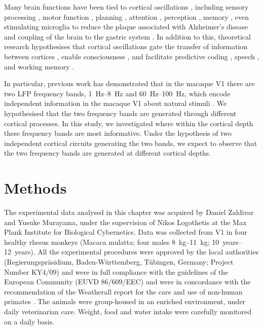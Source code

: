 Many brain functions have been tied to cortical oscillations \citep{Buzsaki2004science,Einevoll2013,Colgin2016}, including sensory processing \citep{Henrie2005,Kreiman2006,Mazzoni2011,Szymanski2011}, motor function \citep{Scherberger2005,Rickert2005}, planning \citep{Buzsaki2015}, attention \citep{Fries2001,Jensen2007,Klimesch2012}, perception \citep{Grossberg1991,Fries1997,Gross2007}, memory \citep{Klimesch1999,Raghavachari2001,Pesaran2002,Jensen2002,Jensen2007,Liebe2012}, even stimulating microglia to reduce the plaque associated with Alzheimer's disease \citep{Iaccarino2016} and coupling of the brain to the gastric system \citep{Monto2008,Richter2017}.
In addition to this, theoretical research hypothesises that cortical oscillations gate the transfer of information between cortices \citep{Ahissar2015}, enable consciousness \citep{Llinas1998}, and facilitate predictive coding \citep{Arnal2012}, speech \citep{Giraud2012}, and working memory \citep{Dipoppa2013}.

In particular, previous work has demonstrated that in the macaque \ac{V1} there are two \ac{LFP} frequency bands, \SIrange{1}{8}{Hz} and \SIrange{60}{100}{Hz}, which encode independent information in the macaque \ac{V1} about natural stimuli \citep{Belitski2008}.
We hypothesised that the two frequency bands are generated through different cortical processes.
In this study, we investigated where within the cortical depth these frequency bands are most informative.
Under the hypothesis of two independent cortical circuits generating the two bands, we expect to observe that the two frequency bands are generated at different cortical depths.


\section{Methods}
\label{sec:lam_exp}


The experimental data analysed in this chapter was acquired by Daniel Zaldivar and Yusuke Murayama, under the supervision of Nikos Logothetis at the Max Plank Institute for Biological Cybernetics.
Data was collected from \ac{V1} in four healthy rhesus monkeys (Macaca mulatta; four males \SIrange{8}{11}{kg}; \SIrange{10}{12}{years}).
All the experimental procedures were approved by the local authorities (Regierungspr\"asidium, Baden-W\"urttemberg, T\"ubingen, Germany; Project Number KY4/09) and were in full compliance with the guidelines of the European Community (EUVD 86/609/EEC) and were in concordance with the recommendation of the Weatherall report for the care and use of non-human primates \citep{Weatherall2006}.
The animals were group-housed in an enriched environment, under daily veterinarian care.
Weight, food and water intake were carefully monitored on a daily basis.


